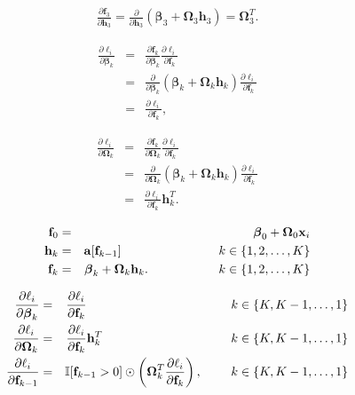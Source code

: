 \documentclass[letterpaper,twoside,openany, titlepage,oldfontcommands,titles,dvipsnames]{memoir}
\begin{document}
\begin{eqnarray}
  \frac{\partial \mathbf{f}_3}{\partial \mathbf{h}_{3}} = \frac{\partial}{\partial \mathbf{h}_{3}}\left(\boldsymbol\beta_{3} +\boldsymbol\Omega_{3}\mathbf{h}_{3}\right) = \boldsymbol\Omega_{3}^{T}.
  \end{eqnarray}

\begin{eqnarray}
 \frac{\partial \ell_{i}}{\partial \boldsymbol\beta_k} &=& \frac{\partial \mathbf{f}_{k}}{\partial \boldsymbol\beta_k} \frac{\partial \ell_{i}}{\partial \mathbf{f}_{k}} \nonumber\\
 &=& \frac{\partial}{\partial \boldsymbol\beta_k}\left(\boldsymbol\beta_{k} +\boldsymbol\Omega_{k}\mathbf{h}_{k}\right) \frac{\partial \ell_{i}}{\partial \mathbf{f}_{k}} \nonumber \\ 
 &=& \frac{\partial \ell_{i}}{\partial \mathbf{f}_{k}},
 \end{eqnarray}

\begin{eqnarray}
 \frac{\partial \ell_{i}}{\partial \boldsymbol\Omega_k} &=& \frac{\partial \mathbf{f}_{k}}{\partial \boldsymbol\Omega_k} \frac{\partial \ell_{i}}{\partial \mathbf{f}_{k}} \nonumber\\
 &=& \frac{\partial}{\partial \boldsymbol\Omega_k}\left(\boldsymbol\beta_{k} +\boldsymbol\Omega_{k}\mathbf{h}_{k}\right) \frac{\partial \ell_{i}}{\partial \mathbf{f}_{k}} \nonumber \\ 
 &=& \frac{\partial \ell_{i}}{\partial \mathbf{f}_{k}}\mathbf{h}_k^{T}.
 \end{eqnarray}

\begin{eqnarray}
  \mathbf{f}_{0} &=& \boldsymbol\beta_{0} +\boldsymbol\Omega_{0}\mathbf{x}_i\nonumber \\
  \mathbf{h}_{k} &=& \mathbf{a}[\mathbf{f}_{k-1}]\hspace{2.76cm} k\in\{1,2,\ldots, K\}\nonumber \\
  \mathbf{f}_{k} &=& \boldsymbol\beta_{k} +\boldsymbol\Omega_{k}\mathbf{h}_{k}.\hspace{2cm} k\in\{1,2,\ldots, K\}
 \end{eqnarray}

\begin{eqnarray}\label{eq:train2_bp_backward_summary}
 \frac{\partial \ell_{i}}{\partial \boldsymbol\beta_k} &=& \frac{\partial \ell_{i}}{\partial \mathbf{f}_k} \hspace{4.1cm} k\in\{K,K-1,\ldots, 1\}\nonumber\\
 \frac{\partial \ell_{i}}{\partial \boldsymbol\Omega_k} &=& \frac{\partial \ell_{i}}{\partial \mathbf{f}_k}\mathbf{h}_{k}^{T}\hspace{3.65cm} k\in\{K,K-1,\ldots, 1\}\nonumber\\
 \frac{\partial \ell_{i}}{\partial \mathbf{f}_{k-1}} &=& \mathbb{I}[\mathbf{f}_{k-1}>0]\odot \left(\boldsymbol\Omega_{k}^{T}\frac{\partial \ell_{i}}{\partial \mathbf{f}_{k}}\right),\hspace{0.82cm} k\in\{K,K-1,\ldots, 1\}
 \end{eqnarray}
\end{document}
